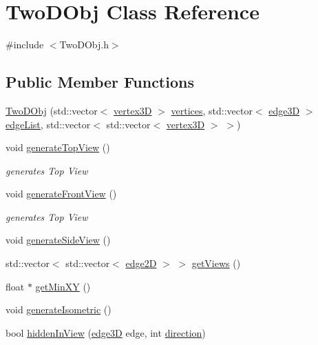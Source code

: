 \hypertarget{class_two_d_obj}{}\section{Two\+D\+Obj Class Reference}
\label{class_two_d_obj}


{\ttfamily \#include $<$Two\+D\+Obj.\+h$>$}

\subsection*{Public Member Functions}
\begin{DoxyCompactItemize}
\item 
\mbox{\hyperlink{class_two_d_obj_aa3c92bdec23c2c687b3e238934e24590}{Two\+D\+Obj}} (std\+::vector$<$ \mbox{\hyperlink{structvertex3_d}{vertex3D}} $>$ \mbox{\hyperlink{class_two_d_obj_ae1325111bfe55914cdcb399bc299442b}{vertices}}, std\+::vector$<$ \mbox{\hyperlink{structedge3_d}{edge3D}} $>$ \mbox{\hyperlink{class_two_d_obj_a48a318d3eac2dc2f2997aa4a4dc2450f}{edge\+List}}, std\+::vector$<$ std\+::vector$<$ \mbox{\hyperlink{structvertex3_d}{vertex3D}} $>$ $>$)
\item 
void \mbox{\hyperlink{class_two_d_obj_a3e4e17ffd7b54bf442bfce6387ed4c27}{generate\+Top\+View}} ()
\begin{DoxyCompactList}\small\item\em generates Top View \end{DoxyCompactList}\item 
void \mbox{\hyperlink{class_two_d_obj_a40fa2f831edda30806a28e30ae0b0feb}{generate\+Front\+View}} ()
\begin{DoxyCompactList}\small\item\em generates Top View \end{DoxyCompactList}\item 
void \mbox{\hyperlink{class_two_d_obj_a19b8f32d11ae455e15297aefa0028967}{generate\+Side\+View}} ()
\item 
std\+::vector$<$ std\+::vector$<$ \mbox{\hyperlink{structedge2_d}{edge2D}} $>$ $>$ \mbox{\hyperlink{class_two_d_obj_a0e7b5705ad697c100b39a1475b46475a}{get\+Views}} ()
\item 
float $\ast$ \mbox{\hyperlink{class_two_d_obj_ab6d468aec6681bef559fc2f222d7063a}{get\+Min\+XY}} ()
\item 
void \mbox{\hyperlink{class_two_d_obj_a6df93c379589948f30db2eacfa5d68bb}{generate\+Isometric}} ()
\item 
bool \mbox{\hyperlink{class_two_d_obj_ab0d27341367906fc4f4d9e5e8b4b8543}{hidden\+In\+View}} (\mbox{\hyperlink{structedge3_d}{edge3D}} edge, int \mbox{\hyperlink{structdirection}{direction}})

\end{DoxyCompactItemize}
